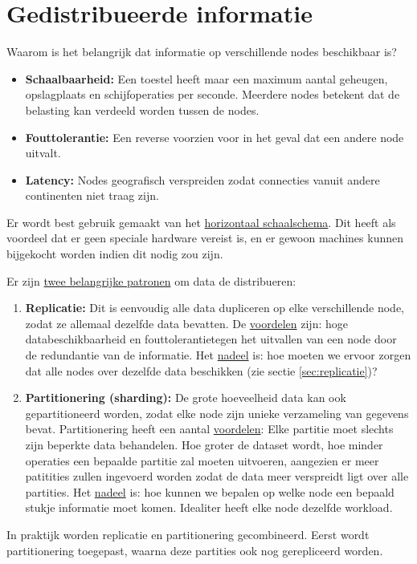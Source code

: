 \documentclass{report}
\begin{document}
	\chapter{Gedistribueerde informatie}
	Waarom is het belangrijk dat informatie op verschillende nodes beschikbaar is?
	\begin{itemize}
		\item \textbf{Schaalbaarheid:} Een toestel heeft maar een maximum aantal geheugen, opslagplaats en schijfoperaties per seconde. Meerdere nodes betekent dat de belasting kan verdeeld worden tussen de nodes.
		\item \textbf{Fouttolerantie:} Een reverse voorzien voor in het geval dat een andere node uitvalt.
		\item \textbf{Latency:} Nodes geografisch verspreiden zodat connecties vanuit andere continenten niet traag zijn.
	\end{itemize}
	Er wordt best gebruik gemaakt van het \underline{horizontaal schaalschema}. Dit heeft als voordeel dat er geen speciale hardware vereist is, en er gewoon machines kunnen bijgekocht worden indien dit nodig zou zijn.

	Er zijn \underline{twee belangrijke patronen} om data de distribueren:
	\begin{enumerate}
		\item \textbf{Replicatie:} Dit is eenvoudig alle data dupliceren op elke verschillende node, zodat ze allemaal dezelfde data bevatten. De \underline{voordelen} zijn: hoge databeschikbaarheid en fouttolerantietegen het uitvallen van een node door de redundantie van de informatie. Het \underline{nadeel} is: hoe moeten we ervoor zorgen dat alle nodes over dezelfde data beschikken (zie sectie \ref{sec:replicatie})? 
		\item \textbf{Partitionering (sharding):} De grote hoeveelheid data kan ook gepartitioneerd worden, zodat elke node zijn unieke verzameling van gegevens bevat. Partitionering heeft een aantal \underline{voordelen}: Elke partitie moet slechts zijn beperkte data behandelen. Hoe groter de dataset wordt, hoe minder operaties een bepaalde partitie zal moeten uitvoeren, aangezien er meer patitities zullen ingevoerd worden zodat de data meer verspreidt ligt over alle partities. Het \underline{nadeel} is: hoe kunnen we bepalen op welke node een bepaald stukje informatie moet komen. Idealiter heeft elke node dezelfde workload.
	\end{enumerate}
	In praktijk worden replicatie en partitionering gecombineerd. Eerst wordt partitionering toegepast, waarna deze partities ook nog gerepliceerd worden.
\end{document}
